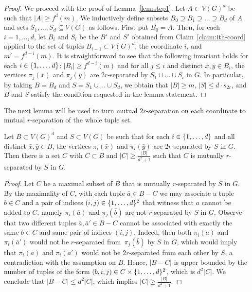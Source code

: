 \begin{proof}
We proceed with the proof of Lemma~\ref{lem:step1}.  Let
$A\subset V(G)^d$ be such that $|A|\ge f^d(m)$.  We inductively define
subsets $B_0\supseteq B_1\supseteq \ldots \supseteq B_d$ of $A$ and
sets $S_1,\ldots,S_d\subseteq V(G)$ as follows.  First put
$B_0=A$. Then, for each $i=1,\ldots,d$, let $B_{i}$ and $S_i$ be the
$B'$ and $S'$ obtained from Claim~\ref{claim:ith-coord} applied to the
set of tuples $B_{i-1}\subset V(G)^d$, the coordinate $i$, and
$m'=f^{d-i}(m)$.  It is straightforward to see that the following
invariant holds for each $i\in \{1,\ldots,d\}$:
$|B_i|\ge f^{d-i}(m)$ and for all $j\leq i$ and distinct
$\bar x,\bar y\in B_i$, the vertices $\pi_j(\bar x)$ and
$\pi_j(\bar{y})$ are $2r$-separated by $S_1\cup\ldots\cup S_i$ in $G$.
In particular, by taking $B=B_d$ and $S=S_1\cup\ldots \cup S_d$, we
obtain that $|B|\ge m$, $|S|\le d\cdot s_{2r}$, and $B$ and $S$
satisfy the condition requested in the lemma statement.
\end{proof}

The next lemma will be used to turn mutual $2r$-separation on each
coordinate to mutual $r$-separation of the whole tuple set.

\begin{lemma}\label{lem:step2}
  Let $B\subset V(G)^d$ and $S\subset V(G)$ be such that for each
  $i\in \{1,\ldots,d\}$ and all distinct $\bar{x},\bar{y}\in B$, the
  vertices $\pi_i(\bar{x})$ and $\pi_i(\bar{y})$ are $2r$-separated by
  $S$ in $G$.  Then there is a set $C$ with $C\subset B$ and
  $|C|\geq\frac{|B|}{d^2+1}$ such that $C$ is mutually $r$-separated
  by $S$ in $G$.
\end{lemma}
\begin{proof}
  Let $C$ be a maximal subset of $B$ that is mutually $r$-separated by
  $S$ in $G$.  By the maximality of $C$, with each tuple
  $\bar a\in B-C$ we may associate a tuple $\bar b\in C$ and a pair of
  indices $(i,j)\in \{1,\ldots,d\}^2$ that witness that $a$ cannot
  be added to $C$, namely $\pi_i(\bar a)$ and $\pi_j(\bar b)$ are not
  $r$-separated by $S$ in $G$.  Observe that two different tuples
  $\bar a,\bar a'\in B-C$ cannot be associated with exactly the same
  $\bar b\in C$ and same pair of indices $(i,j)$.  Indeed, then both
  $\pi_i(\bar a)$ and $\pi_i(\bar a')$ would not be $r$-separated
  from~$\pi_j(\bar b)$ by $S$ in $G$, which would imply that
  $\pi_i(\bar a)$ and $\pi_i(\bar a')$ would not be $2r$-separated
  from each other by $S$, a contradiction with the assumption on $B$.
  Hence, $|B-C|$ is upper bounded by the number of tuples of the form
  $(\bar b,i,j)\in C\times \{1,\ldots,d\}^2$, which is $d^2|C|$.  We
  conclude that $|B-C|\leq d^2|C|$, which implies
  $|C|\geq \frac{|B|}{d^2+1}$.
\end{proof}


